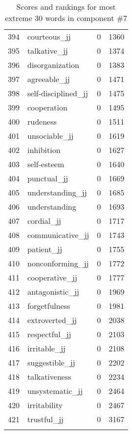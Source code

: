 \begin{longtable}[!htbp]{| rlr@{.}l |}
    394 & courteous\_jj & 0 & 1360 \\
    395 & talkative\_jj & 0 & 1374 \\
    396 & disorganization & 0 & 1383 \\
    397 & agreeable\_jj & 0 & 1471 \\
    398 & self-disciplined\_jj & 0 & 1475 \\
    399 & cooperation & 0 & 1495 \\
    400 & rudeness & 0 & 1511 \\
    401 & unsociable\_jj & 0 & 1619 \\
    402 & inhibition & 0 & 1627 \\
    403 & self-esteem & 0 & 1640 \\
    404 & punctual\_jj & 0 & 1669 \\
    405 & understanding\_jj & 0 & 1685 \\
    406 & understanding & 0 & 1693 \\
    407 & cordial\_jj & 0 & 1717 \\
    408 & communicative\_jj & 0 & 1743 \\
    409 & patient\_jj & 0 & 1755 \\
    410 & nonconforming\_jj & 0 & 1772 \\
    411 & cooperative\_jj & 0 & 1777 \\
    412 & antagonistic\_jj & 0 & 1969 \\
    413 & forgetfulness & 0 & 1981 \\
    414 & extroverted\_jj & 0 & 2038 \\
    415 & respectful\_jj & 0 & 2103 \\
    416 & irritable\_jj & 0 & 2108 \\
    417 & suggestible\_jj & 0 & 2202 \\
    418 & talkativeness & 0 & 2234 \\
    419 & unsystematic\_jj & 0 & 2464 \\
    420 & irritability & 0 & 2467 \\
    421 & trustful\_jj & 0 & 3167 \\
    \hline
    \caption{Scores and rankings for most extreme 30 words in component \#7} \\
\end{longtable}
